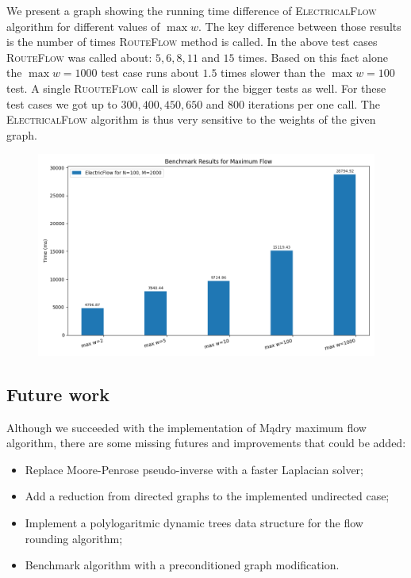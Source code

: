 We present a graph showing the running time difference of \textsc{ElectricalFlow} algorithm for different values of $\max w$. The key difference between those results is the number of times \textsc{RouteFlow} method is called. In the above test cases \textsc{RouteFlow} was called about: $5,6,8,11$ and $15$ times. Based on this fact alone the $\max w=1000$ test case runs about $1.5$ times slower than the $\max w=100$ test. A single \textsc{RuouteFlow} call is slower for the bigger tests as well. For these test cases we got up to $300, 400, 450, 650$ and $800$ iterations per one call. The \textsc{ElectricalFlow} algorithm is thus very sensitive to the weights of the given graph.

\begin{figure}[H]
\centering\includegraphics[width=\linewidth]{4_implementation/plots/plot_flow_2.png}
\end{figure}

\subsection{Future work}
Although we succeeded with the implementation of Mądry \cite{madry} maximum flow algorithm, there are some missing futures and improvements that could be added:
\begin{itemize}
    \item Replace Moore-Penrose pseudo-inverse with a faster Laplacian solver;
    \item Add a reduction from directed graphs to the implemented undirected case;
    \item Implement a polylogaritmic dynamic trees data structure for the flow rounding algorithm;
    \item Benchmark algorithm with a preconditioned graph modification.
\end{itemize}
